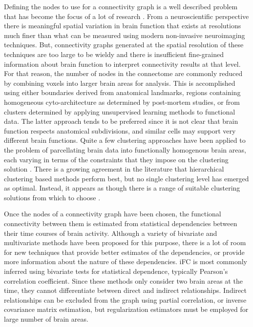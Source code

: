 Defining the nodes to use for a connectivity graph is a well described problem that has become the focus of a lot of research \cite{Thirion2014}. From a neuroscientific perspective there is meaningful spatial variation in brain function that exists at resolutions much finer than what can be measured using modern non-invasive neuroimaging techniques. But, connectivity graphs generated at the spatial resolution of these techniques are too large to be wieldy and there is insufficient fine-grained information about brain function to interpret connectivity results at that level. For that reason, the number of nodes in the connectome are commonly reduced by combining voxels into larger brain areas for analysis. This is accomplished using either boundaries derived from anatomical landmarks\cite{Desikan2006,AAL2002}, regions containing homogeneous cyto-architecture as determined by post-mortem studies\cite{Eickhoff2008}, or from clusters determined by applying unsupervised learning methods to functional data\cite{Bellec2006,Craddock2012}. The latter approach tends to be preferred since it is not clear that brain function respects anatomical subdivisions, and similar cells may support very different brain functions\cite{Craddock2012}. Quite a few clustering approaches have been applied to the problem of parcellating brain data into functionally homogenous brain areas, each varying in terms of the constraints that they impose on the clustering solution \cite{Craddock2012,Blumensath2013,Bellec2006,Thirion2006,Zalesky2010,Flandin2002,Thirion2014}. There is a growing agreement in the literature that hierarchical clustering based methods perform best\cite{Blumensath2013,Thirion2014}, but no single clustering level has emerged as optimal. Instead, it appears as though there is a range of suitable clustering solutions from which to choose \cite{Craddock2012,Thirion2014}.  


Once the nodes of a connectivity graph have been chosen, the functional connectivity between them is estimated from statistical dependencies between their time courses of brain activity. Although a variety of bivariate and multivariate methods have been proposed for this purpose\cite{Smith2011,Varoquaux2013}, there is a lot of room for new techniques that provide better estimates of the dependencies, or provide more information about the nature of these dependencies. iFC is most commonly inferred using bivariate tests for statistical dependence, typically Pearson's correlation coefficient\cite{Biswal1995}. Since these methods only consider two brain areas at the time, they cannot differentiate between direct and indirect relationships. Indirect relationships can be excluded from the graph using partial correlation, or inverse covariance matrix estimation, but regularization estimators must be employed for large number of brain areas\cite{Ryali2012,Varoquaux2013}. 

